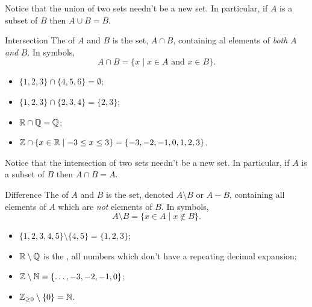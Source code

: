 \documentclass[fleqn]{LectureClass/LectureClass}
\begin{document}
    Notice that the union of two sets needn't be a new set.
    In particular, if \(A\) is a subset of \(B\) then \(A \cup B = B\).
    
    \begin{dfn}{Intersection}{}
        The  of \(A\) and \(B\) is the set, \({A \cap B}\), containing al elements of \emph{both} \(A\) \emph{and} \(B\).
        In symbols,
        \begin{equation}
            A \cap B = \{x \mid x \in A \text{ and } x \in B\}.
        \end{equation}
    \end{dfn}
    
    \begin{exm}{}{}
        \begin{itemize}
            \item \(\{1, 2, 3\} \cap \{4, 5, 6\} = \emptyset\);
            \item \(\{1, 2, 3\} \cap \{2, 3, 4\} = \{2, 3\}\);
            \item \(\mathbb{R} \cap \mathbb{Q} = \mathbb{Q}\);
            \item \(\mathbb{Z} \cap \{x \in \mathbb{R} \mid -3 \le x \le 3\} = \{-3, -2, -1, 0, 1, 2, 3\}\).
        \end{itemize}
    \end{exm}
    
    Notice that the intersection of two sets needn't be a new set.
    In particular, if \(A\) is a subset of \(B\) then \(A \cap B = A\).
    
    \begin{dfn}{Difference}{}
        The  of \(A\) and \(B\) is the set, denoted \(A \setminus B\) or \(A - B\), containing all elements of \(A\) which are \emph{not} elements of \(B\).
        In symbols,
        \begin{equation}
            A \setminus B = \{x \in A \mid x \notin B\}.
        \end{equation}
    \end{dfn}
    
    \begin{exm}{}{}
        \begin{itemize}
            \item \(\{1, 2, 3, 4, 5\} \setminus \{4, 5\} = \{1, 2, 3\}\);
            \item \(\mathbb{R} \setminus \mathbb{Q}\) is the , all numbers which don't have a repeating decimal expansion;
            \item \(\mathbb{Z} \setminus \mathbb{N} = \{\dotsc, -3, -2, -1, 0\}\);
            \item \(\mathbb{Z}_{\ge 0} \setminus \{0\} = \mathbb{N}\).
        \end{itemize}
    \end{exm}
    
\end{document}
